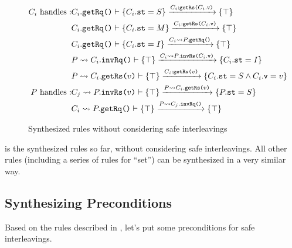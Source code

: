 \documentclass[format=manuscript]{acmart}
\begin{document}
\begin{figure}
  \begin{eqnarray*}
    C_i\ \textrm{handles}: &
    C_i.\texttt{getRq()}\vdash \{ C_i.\texttt{st} = S \} \xrightarrow{C_i:\texttt{getRs(}C_i.\texttt{v}\texttt{)}} \{ \top \} \\
    & C_i.\texttt{getRq()}\vdash \{ C_i.\texttt{st} = M \} \xrightarrow{C_i:\texttt{getRs(}C_i.\texttt{v}\texttt{)}} \{ \top \} \\
    & C_i.\texttt{getRq()}\vdash \{ C_i.\texttt{st} = I \} \xrightarrow{C_i \leadsto P.\texttt{getRq()}} \{ \top \} \\
    & P \leadsto C_i.\texttt{invRq()}\vdash \{ \top \} \xrightarrow{C_i \leadsto P.\texttt{invRs(}C_i.\texttt{v}\texttt{)}} \{ C_i.\texttt{st} = I \} \\
    & P \leadsto C_i.\texttt{getRs(}v\texttt{)}\vdash \{ \top \} \xrightarrow{C_i:\texttt{getRs(}v\texttt{)}} \{ C_i.\texttt{st} = S \wedge C_i.\texttt{v} = v \} \\
    P\ \textrm{handles}: &
    C_j \leadsto P.\texttt{invRs(}v\texttt{)}\vdash \{ \top \} \xrightarrow{P \leadsto C_i.\texttt{getRs(}v\texttt{)}} \{ P.\texttt{st} = S \} \\
    & C_i \leadsto P.\texttt{getRq()}\vdash \{ \top \} \xrightarrow{P \leadsto C_j.\texttt{invRq()}} \{ \top \} \\
  \end{eqnarray*}
  \caption{Synthesized rules without considering safe interleavings}
  \label{fig:synthesized-rules-naive}
\end{figure}

 is the synthesized rules so far, without
considering safe interleavings. All other rules (including a series of rules for
``set'') can be synthesized in a very similar way.

\subsection{Synthesizing Preconditions}

Based on the rules described in , let's put
some preconditions for safe interleavings.
\end{document}
